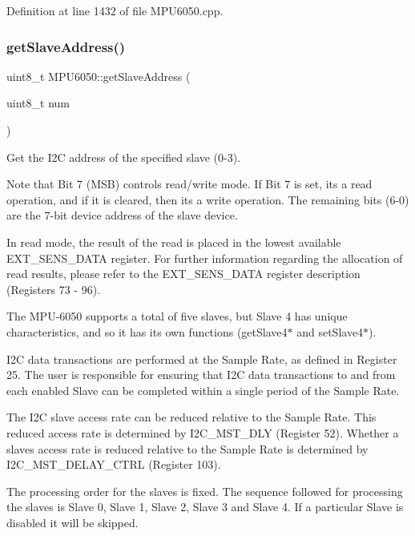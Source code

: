 Definition at line 1432 of file M\+P\+U6050.\+cpp.

\mbox{\label{classMPU6050_af75b9f7ccac48515c7544238db0e6863}} 
\subsubsection{\texorpdfstring{getSlaveAddress()}{getSlaveAddress()}}
{\footnotesize\ttfamily uint8\+\_\+t M\+P\+U6050\+::get\+Slave\+Address (\begin{DoxyParamCaption}\item[{uint8\+\_\+t}]{num }\end{DoxyParamCaption})}



Get the I2C address of the specified slave (0-\/3). 

Note that Bit 7 (M\+SB) controls read/write mode. If Bit 7 is set, it\textquotesingle{}s a read operation, and if it is cleared, then it\textquotesingle{}s a write operation. The remaining bits (6-\/0) are the 7-\/bit device address of the slave device.

In read mode, the result of the read is placed in the lowest available E\+X\+T\+\_\+\+S\+E\+N\+S\+\_\+\+D\+A\+TA register. For further information regarding the allocation of read results, please refer to the E\+X\+T\+\_\+\+S\+E\+N\+S\+\_\+\+D\+A\+TA register description (Registers 73 -\/ 96).

The M\+P\+U-\/6050 supports a total of five slaves, but Slave 4 has unique characteristics, and so it has its own functions (get\+Slave4$\ast$ and set\+Slave4$\ast$).

I2C data transactions are performed at the Sample Rate, as defined in Register 25. The user is responsible for ensuring that I2C data transactions to and from each enabled Slave can be completed within a single period of the Sample Rate.

The I2C slave access rate can be reduced relative to the Sample Rate. This reduced access rate is determined by I2\+C\+\_\+\+M\+S\+T\+\_\+\+D\+LY (Register 52). Whether a slave\textquotesingle{}s access rate is reduced relative to the Sample Rate is determined by I2\+C\+\_\+\+M\+S\+T\+\_\+\+D\+E\+L\+A\+Y\+\_\+\+C\+T\+RL (Register 103).

The processing order for the slaves is fixed. The sequence followed for processing the slaves is Slave 0, Slave 1, Slave 2, Slave 3 and Slave 4. If a particular Slave is disabled it will be skipped.

